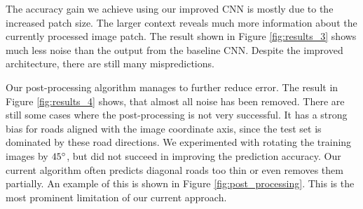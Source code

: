 \documentclass[10pt,conference,compsocconf]{IEEEtran}
\begin{document}
\par 
The accuracy gain we achieve using our improved CNN is mostly due to the increased patch size. The larger context reveals much more information about the currently processed image patch. The result shown in Figure \ref{fig:results_3} shows much less noise than the output from the baseline CNN. Despite the improved architecture, there are still many mispredictions. 

\par
Our post-processing algorithm manages to further reduce error. The result in Figure \ref{fig:results_4} shows, that almost all noise has been removed. There are still some cases where the post-processing is not very successful. It has a strong bias for roads aligned with the image coordinate axis, since the test set is dominated by these road directions. We experimented with rotating the training images by $ 45\degree $, but did not succeed in improving the prediction accuracy. Our current algorithm often predicts diagonal roads too thin or even removes them partially. An example of this is shown in Figure \ref{fig:post_processing}. This is the most prominent limitation of our current approach.
\end{document}
